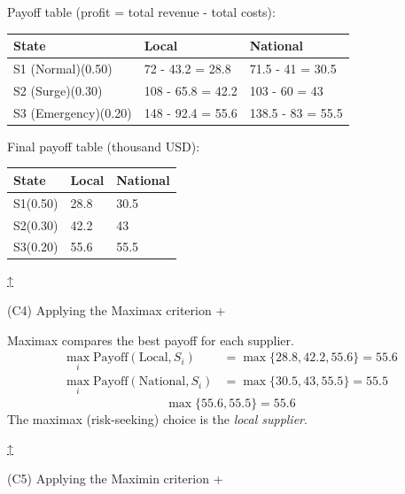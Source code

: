 \documentclass[11pt]{article}
\begin{document}
	
	Payoff table (profit = total revenue - total costs):
	\begin{center}
		\begin{tabular}{lll}
			\toprule
			State & Local & National \\
			\midrule
			S1 (Normal)\newline (0.50) & 72 - 43.2 = 28.8 & 71.5 - 41 = 30.5 \\
			S2 (Surge)\newline (0.30) & 108 - 65.8 = 42.2 & 103 - 60 = 43 \\
			S3 (Emergency)\newline (0.20) & 148 - 92.4 = 55.6 & 138.5 - 83 = 55.5 \\
			\bottomrule
		\end{tabular}
	\end{center}
	
	
	Final payoff table (thousand USD):
	\begin{center}
		\begin{tabular}{lll}
			\toprule
			State & Local & National \\
			\midrule
			S1\newline (0.50) & 28.8 & 30.5 \\
			S2\newline (0.30) & 42.2 & 43 \\
			S3\newline (0.20) & 55.6 & 55.5 \\
			\bottomrule
		\end{tabular}
	\end{center}
	
	
	
	
	\hyperref[problem7-criteria]{↑}
	
	
	
	
	(C4) Applying the Maximax criterion
	+
	
	
	Maximax compares the best payoff for each supplier.
	\[
	\begin{aligned}
		\max_i \text{Payoff}(\text{Local}, S_i) &= \max\{28.8, 42.2, 55.6\} = 55.6 \\
		\max_i \text{Payoff}(\text{National}, S_i) &= \max\{30.5, 43, 55.5\} = 55.5
	\end{aligned}
	\]
	\[
	\max\{55.6, 55.5\} = 55.6
	\]
	The maximax (risk-seeking) choice is the \emph{local supplier}.
	
	
	\hyperref[problem7-criteria]{↑}
	
	
	
	
	(C5) Applying the Maximin criterion
	+
	
\end{document}
